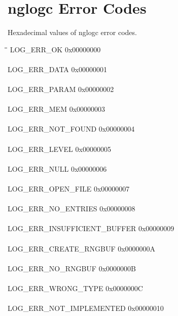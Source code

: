 \documentclass[a4paper, titlepage, 11pt]{article}
\begin{document}
\newpage

\section{nglogc Error Codes}
Hexadecimal values of nglogc error codes.
\begin{tabbing}
\hspace*{1cm}\=\hspace*{8cm}\=\hspace*{0,6cm}\= \kill
\> LOG\_ERR\_OK                    \>  0x00000000 \\ \\
\> LOG\_ERR\_DATA                  \>  0x00000001 \\ \\
\> LOG\_ERR\_PARAM                 \>  0x00000002 \\ \\
\> LOG\_ERR\_MEM                   \>  0x00000003 \\ \\
\> LOG\_ERR\_NOT\_FOUND            \>  0x00000004 \\ \\
\> LOG\_ERR\_LEVEL                 \>  0x00000005 \\ \\
\> LOG\_ERR\_NULL                  \>  0x00000006 \\ \\
\> LOG\_ERR\_OPEN\_FILE            \>  0x00000007 \\ \\
\> LOG\_ERR\_NO\_ENTRIES           \>  0x00000008 \\ \\
\> LOG\_ERR\_INSUFFICIENT\_BUFFER  \>  0x00000009 \\ \\
\> LOG\_ERR\_CREATE\_RNGBUF        \>  0x0000000A \\ \\
\> LOG\_ERR\_NO\_RNGBUF            \>  0x0000000B \\ \\
\> LOG\_ERR\_WRONG\_TYPE           \>  0x0000000C \\ \\
\> LOG\_ERR\_NOT\_IMPLEMENTED      \>  0x00000010 \\ \\
\end{tabbing}
\end{document}
